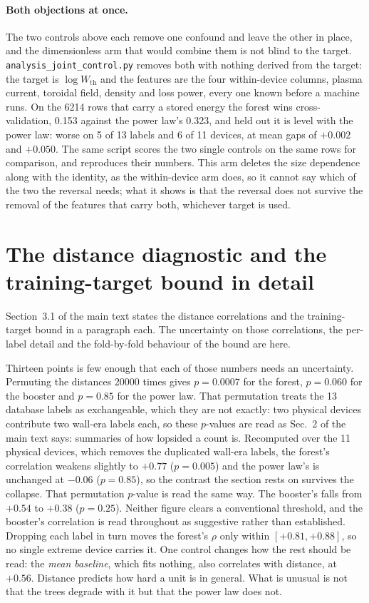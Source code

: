 \documentclass[12pt,letterpaper]{article}
\begin{document}
\paragraph{Both objections at once.} The two controls above each remove one
confound and leave the other in place, and the dimensionless arm that would
combine them is not blind to the target. \texttt{analysis\_joint\_control.py}
removes both with nothing derived from the target: the target is
$\log W_{\mathrm{th}}$ and the features are the four within-device columns,
plasma current, toroidal field, density and loss power, every one known
before a machine runs. On the 6214 rows that carry a stored energy the forest
wins cross-validation, 0.153 against the power law's 0.323, and held out it
is level with the power law: worse on 5 of 13 labels and 6 of 11 devices, at
mean gaps of $+0.002$ and $+0.050$. The same script scores the two single
controls on the same rows for comparison, and reproduces their numbers. This
arm deletes the size dependence along with the identity, as the within-device
arm does, so it cannot say which of the two the reversal needs; what it shows
is that the reversal does not survive the removal of the features that carry
both, whichever target is used.

\section{The distance diagnostic and the training-target bound in detail}
\label{supp:distance}

Section~3.1 of the main text states the distance correlations and the
training-target bound in a paragraph each. The uncertainty on those
correlations, the per-label detail and the fold-by-fold behaviour of the bound
are here.

Thirteen points is few enough that each of those numbers needs an uncertainty.
Permuting the distances 20000 times gives $p=0.0007$ for the forest, $p=0.060$
for the booster and $p=0.85$ for the power law. That permutation treats the 13
database labels as exchangeable, which they are not exactly: two physical
devices contribute two wall-era labels each, so these $p$-values are read as
Sec.~2 of the main text says: summaries of how lopsided a count is. Recomputed over the 11 physical devices, which
removes the duplicated wall-era labels, the forest's correlation weakens slightly to
$+0.77$ ($p=0.005$) and the power law's is unchanged at $-0.06$ ($p=0.85$),
so the contrast the section rests on survives the collapse. That permutation
$p$-value is read the same way. The booster's falls
from $+0.54$ to $+0.38$ ($p=0.25$). Neither figure clears a conventional
threshold, and the booster's correlation is read throughout as suggestive rather
than established. Dropping each label in turn moves the forest's $\rho$ only
within $[+0.81,+0.88]$, so no single extreme device carries it. One control
changes how
the rest should be read: the \emph{mean baseline}, which fits nothing, also
correlates with distance, at $+0.56$. Distance predicts how hard a unit is in
general. What is unusual is not that the trees degrade with it but that the
power law does not.
\end{document}
